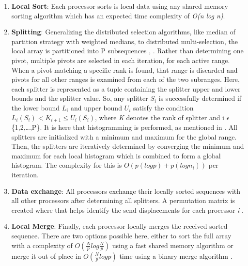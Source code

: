 \documentclass[11pt]{article}       %
\begin{document}
\begin {enumerate}
\item \textbf{Local Sort}: Each processor sorts is local data using any shared memory sorting algorithm which has an expected time complexity of \emph{O(n log n)}.
\item \textbf{Splitting}: Generalizing the distributed selection algorithms, like median of partition strategy with weighted medians, to distributed multi-selection, the local array is partitioned into P subsequences \cite{paper2}, \cite{paper2s30}. Rather than determining one pivot, multiple pivots are selected in each iteration, for each active range. When a pivot matching a specific rank is found, that range is discarded and pivots for all other ranges is examined from each of the two subranges. Here, each splitter is represented as a tuple containing the splitter upper and lower bounds and the splitter value. So, any splitter \emph {$S_{i}$} is successfully determined if the lower bound \emph {$L_{i}$} and upper bound \emph {$U_{i}$} satisfy the condition $ L_{i}(S_{i}) < K_{i+1} \leq U_{i}(S_{i}) $, where \emph K denotes the rank of splitter and i $\epsilon$ \{1,2,…,P\}. 
It is here that histogramming is performed, as mentioned in \cite{paper2}. All splitters are initialized with a minimum and maximum for the global range. Then, the splitters are iteratively determined by converging the minimum and maximum for each local histogram which is combined to form a global histogram. The complexity for this is $ O(p(log p) + p(log  n_i))$ per iteration. 
\item \textbf{Data exchange}: All processors exchange their locally sorted sequences with all other processors after determining all splitters. A permutation matrix is created where that helps identify the send displacements for each processor \emph i \cite{paper2}. 
\item\textbf{ Local Merge}: Finally, each processor locally merges the received sorted sequence. There are two options possible here, either to sort the full array with a complexity of $ O\left ( \frac {N}{p} log \frac {N}{p}\right )$ using a fast shared memory algorithm or merge it out of place in $O\left ( \frac {N}{p} log p\right) $ time using a binary merge algorithm \cite{paper2}. 
\end{enumerate}
\end{document}
